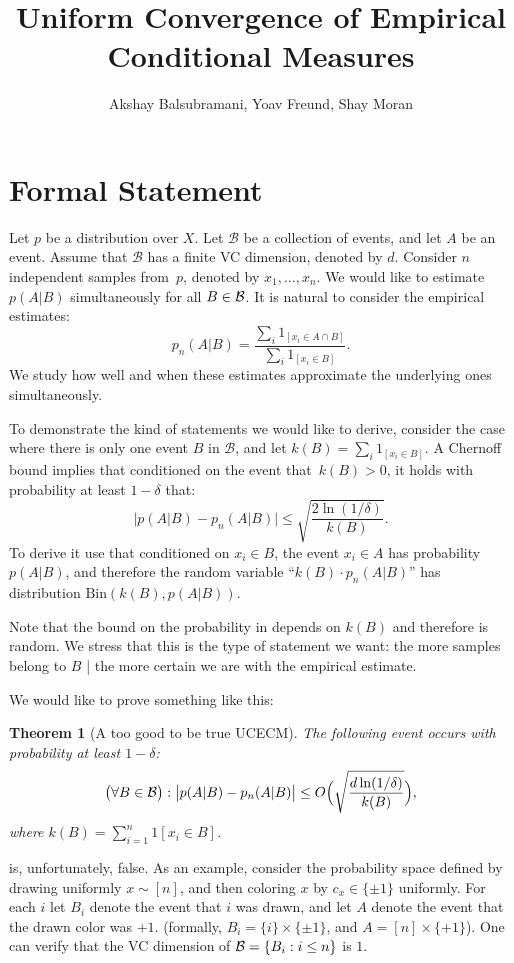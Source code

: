 \documentclass{article}
\title{Uniform Convergence of Empirical Conditional Measures}
\author{Akshay Balsubramani, Yoav Freund, Shay Moran}
\newtheorem{theorem}{Theorem}[section]
\newcommand{\B}{{\cal B}}
\newcommand{\cB}{\mathcal{B}}
\begin{document}
\maketitle

\section{Formal Statement}

Let $p$ be a distribution over $X$.
Let $\cB$ be a collection of events, and let $A$ be an event.
Assume that $\cB$ has a finite VC dimension, denoted by $d$.
Consider $n$ independent samples from~$p$, denoted by $x_1,\ldots,x_n$.
We would like to estimate $p(A \vert B)$ simultaneously for all $B\in \B$.
It is natural to consider the empirical estimates:
\[p_n(A\vert B)=\frac{\sum_i 1_{[x_i\in A \cap B]}}{\sum_i 1_{[x_i\in B]}}.\]
We study how well and when these estimates approximate the underlying ones simultaneously.

To demonstrate the kind of statements we would like to derive,
consider the case where there is only one event $B$ in $\cB$, 
and let $k(B)=\sum_i 1_{[x_i\in B]}$.
A Chernoff bound implies that conditioned on the event that~$k(B)>0$, 
it holds with probability at least $1-\delta$ that:
\begin{equation}\label{eq:chernoff}
\bigl\lvert p(A\vert B) - p_n(A \vert B) \bigr\rvert \leq \sqrt{\frac{2\ln(1/\delta)}{k(B)}}.
\end{equation}
To derive it use that conditioned on $x_i\in B$, the event $x_i\in A$ has probability $p(A\vert B)$, 
and therefore the random variable ``$k(B)\cdot p_n(A \vert B)$'' has distribution $\mbox{Bin}(k(B), p(A\vert B))$.

Note that the bound on the probability in  depends on $k(B)$
and therefore is random.
We stress that this is the type of statement we want:
the more samples belong to $B$ | the more certain we are with the empirical estimate.

We would like to prove something like this:
\begin{theorem}[A too good to be true UCECM]\label{thm:toogood}
The following event occurs with probability at least $1-\delta$:
\[\bigl(\forall B\in\B\bigr):\bigl\lvert p(A \vert B) - p_n(A \vert B) \bigr\rvert \leq O\Bigl(\sqrt{\frac{d\ln(1/\delta)}{k(B)}}\Bigr),\]
where $k(B) = \sum_{i=1}^n 1[x_i\in B]$.
\end{theorem}
 is, unfortunately, false. 
As an example, consider the probability space defined by drawing uniformly $x\sim[n]$,
and then coloring $x$ by $c_x\in\{\pm 1\}$ uniformly.
For each $i$ let $B_i$ denote the event that $i$ was drawn,
and let $A$ denote the event that the drawn color was  $+1$.
(formally, $B_i = \{i\}\times\{\pm 1\}$, and $A=[n]\times\{+1\}$).
One can verify that the VC dimension of $\B=\{B_i : i\leq n\}$ is $1$.
\end{document}

